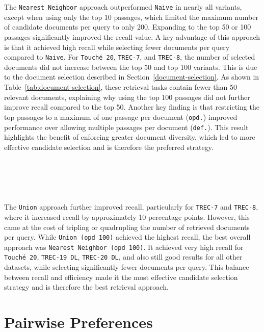 \\\\
The \texttt{Nearest Neighbor} approach outperformed \texttt{Naive} in nearly all variants, except when using only the top 10 passages, which limited the maximum number of candidate documents per query to only 200. Expanding to the top 50 or 100 passages significantly improved the recall value. A key advantage of this approach is that it achieved high recall while selecting fewer documents per query compared to \texttt{Naive}. For \texttt{Touché 20}, \texttt{TREC-7}, and \texttt{TREC-8}, the number of selected documents did not increase between the top 50 and top 100 variants. This is due to the document selection described in Section~\ref{document-selection}. As shown in Table~\ref{tab:document-selection}, these retrieval tasks contain fewer than 50 relevant documents, explaining why using the top 100 passages did not further improve recall compared to the top 50. Another key finding is that restricting the top passages to a maximum of one passage per document (\texttt{opd.}) improved performance over allowing multiple passages per document (\texttt{def.}). This result highlights the benefit of enforcing greater document diversity, which led to more effective candidate selection and is therefore the preferred strategy.
\\\\\\\\\\\\
The \texttt{Union} approach further improved recall, particularly for \texttt{TREC-7} and \texttt{TREC-8}, where it increased recall by approximately 10 percentage points. However, this came at the cost of tripling or quadrupling the number of retrieved documents per query. While \texttt{Union (opd 100)} achieved the highest recall, the best overall approach was \texttt{Nearest Neighbor (opd 100)}. It achieved very high recall for \texttt{Touché 20}, \texttt{TREC-19 DL}, \texttt{TREC-20 DL}, and also still good results for all other datasets, while selecting significantly fewer documents per query. This balance between recall and efficiency made it the most effective candidate selection strategy and is therefore the best retrieval approach.

\section{Pairwise Preferences}\label{eval-pairwise-preferences}

